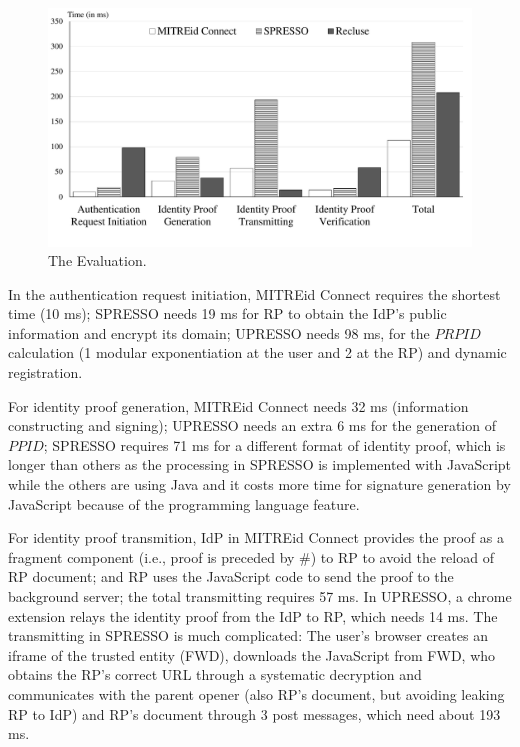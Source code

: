 \begin{figure}
  \centering
  \includegraphics[width=\linewidth]{fig/evaluation2.pdf}
  \caption{The Evaluation.}
  \label{fig:evaluation}
\end{figure}
In the authentication request initiation, MITREid Connect requires the shortest time (10 ms); SPRESSO needs 19 ms for RP to obtain the IdP's public information and encrypt its domain; UPRESSO needs 98 ms, for the $PRPID$ calculation (1 modular exponentiation at the user and 2 at the RP) and dynamic registration.

For identity proof generation, MITREid Connect needs 32 ms (information constructing and signing); UPRESSO needs an extra 6 ms for the generation of $PPID$;  SPRESSO requires 71 ms for a different format of identity proof, which is longer than others as the processing in SPRESSO is implemented with JavaScript while the others are using Java and it costs more time for signature generation by JavaScript because of the programming language feature.

For identity proof transmition, IdP in  MITREid Connect provides the proof as a fragment component (i.e., proof is preceded by \#) to RP to avoid the reload of RP document; and RP uses the JavaScript code to send the proof to the background server; the total transmitting requires 57 ms. In UPRESSO, a chrome extension relays the identity proof from the IdP to RP, which needs 14 ms. The transmitting in SPRESSO is much complicated: The user's browser creates an iframe of the trusted entity (FWD), downloads the JavaScript from FWD, who obtains the RP's correct URL through a systematic decryption and communicates with the parent opener (also RP's document, but avoiding leaking RP to IdP) and RP's document through 3 post messages, which need about 193 ms.

